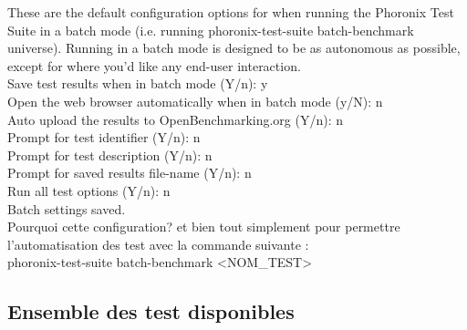 \documentclass[french]{article}
\begin{document}
These are the default configuration options for when running the Phoronix Test Suite in a batch mode (i.e. running phoronix-test-suite batch-benchmark universe). Running in a batch mode is designed to be as autonomous as possible, except for where you'd like any end-user interaction.\\

    Save test results when in batch mode (Y/n): y\\
    Open the web browser automatically when in batch mode (y/N): n\\
    Auto upload the results to OpenBenchmarking.org (Y/n): n\\
    Prompt for test identifier (Y/n): n\\
    Prompt for test description (Y/n): n\\
    Prompt for saved results file-name (Y/n): n\\
    Run all test options (Y/n): n\\
Batch settings saved.\\

Pourquoi cette configuration? et bien tout simplement pour permettre l'automatisation des test avec la commande suivante : \\ 

phoronix-test-suite batch-benchmark <NOM\_TEST>

\subsection{Ensemble des test disponibles}
\end{document}
